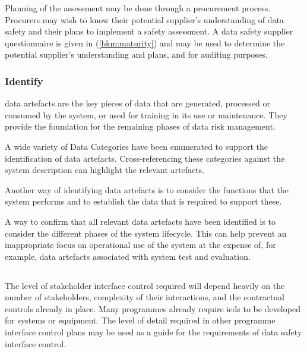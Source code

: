 Planning of the assessment may be done through a procurement process. Procurers may wish to know their potential supplier's understanding of data safety and their plans to implement a \gls{safety assessment}. A data safety supplier questionnaire is given in (\autoref{bkm:maturity}) and may be used to determine the potential supplier's understanding and plans, and for auditing purposes.

\subsubsection{Identify }
\Glspl{data artefact} are the key pieces of data that are generated, processed or consumed by the system, or used for training in its use or maintenance. They provide the foundation for the remaining phases of data risk management.

A wide variety of Data Categories have been enumerated to support the identification of \glspl{data artefact}. Cross-referencing these categories against the system description can highlight the relevant artefacts. 

Another way of identifying \glspl{data artefact} is to consider the functions that the system performs and to establish the data that is required to support these.

A way to confirm that all relevant \glspl{data artefact} have been identified is to consider the different phases of the system lifecycle. This can help prevent an inappropriate focus on operational use of the system at the expense of, for example, \glspl{data artefact} associated with system test and evaluation.

\subsection{}
The level of
\gls{stakeholder}
interface control required will depend heavily on the number of \glspl{stakeholder}, complexity of their interactions, and the contractual controls already in place. Many programmes already require \glspl{icd} to be developed for systems or equipment. The level of detail required in other programme interface control plans may be used as a guide for the requirements of data safety interface control. 

